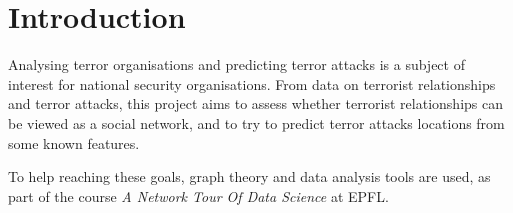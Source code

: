 \section{Introduction}
\label{sec:Introduction}
Analysing terror organisations and predicting terror attacks is a subject of interest for national security organisations. From data on  terrorist relationships and terror attacks, this project aims to assess whether terrorist relationships can be viewed as a social network, and to try to predict terror attacks locations from some known features. 

To help reaching these goals, graph theory and data analysis tools are used, as part of the course \textit{A Network Tour Of Data Science} at EPFL.
%


